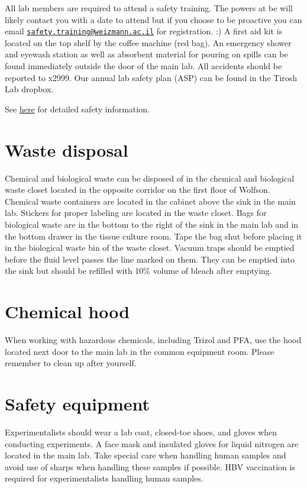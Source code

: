 \documentclass[]{book}
\begin{document}
All lab members are required to attend a safety training. The powers at
be will likely contact you with a date to attend but if you choose to be
proactive you can email
\href{mailto:safety.training@weizmann.ac.il}{\nolinkurl{safety.training@weizmann.ac.il}}
for registration. :) A first aid kit is located on the top shelf by the
coffee machine (red bag). An emergency shower and eyewash station as
well as absorbent material for pouring on spills can be found
immediately outside the door of the main lab. All accidents should be
reported to x2999. Our annual lab safety plan (ASP) can be found in the
Tirosh Lab dropbox.

See
\href{https://www.weizmann.ac.il/safety/chemical-safety/general-guidelines}{here}
for detailed safety information.

\section{Waste disposal}\label{waste-disposal}

Chemical and biological waste can be disposed of in the chemical and
biological waste closet located in the opposite corridor on the first
floor of Wolfson. Chemical waste containers are located in the cabinet
above the sink in the main lab. Stickers for proper labeling are located
in the waste closet. Bags for biological waste are in the bottom to the
right of the sink in the main lab and in the bottom drawer in the tissue
culture room. Tape the bag shut before placing it in the biological
waste bin of the waste closet. Vacuum traps should be emptied before the
fluid level passes the line marked on them. They can be emptied into the
sink but should be refilled with 10\% volume of bleach after emptying.

\section{Chemical hood}\label{chemical-hood}

When working with hazardous chemicals, including Trizol and PFA, use the
hood located next door to the main lab in the common equipment room.
Please remember to clean up after yourself.

\section{Safety equipment}\label{safety-equipment}

Experimentalists should wear a lab coat, closed-toe shoes, and gloves
when conducting experiments. A face mask and insulated gloves for liquid
nitrogen are located in the main lab. Take special care when handling
human samples and avoid use of sharps when handling these samples if
possible. HBV vaccination is required for experimentalists handling
human samples.
\end{document}
